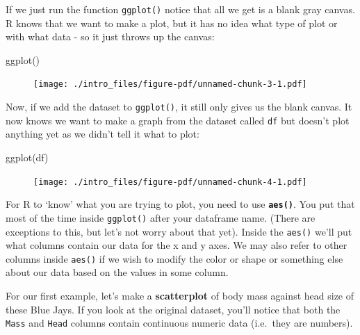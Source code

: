 \documentclass[
  letterpaper,
  DIV=11,
  numbers=noendperiod]{scrreprt}
\newenvironment{Shaded}{\begin{snugshade}}{\end{snugshade}}
\newcommand{\FunctionTok}[1]{\textcolor[rgb]{0.28,0.35,0.67}{#1}}
\newcommand{\NormalTok}[1]{\textcolor[rgb]{0.00,0.23,0.31}{#1}}
\begin{document}
If we just run the function \texttt{ggplot()} notice that all we get is
a blank gray canvas. R knows that we want to make a plot, but it has no
idea what type of plot or with what data - so it just throws up the
canvas:

\begin{Shaded}
\begin{Highlighting}[]
\FunctionTok{ggplot}\NormalTok{()  }
\end{Highlighting}
\end{Shaded}

\begin{figure}[H]

{\centering \texttt{[image: ./intro\_files/figure-pdf/unnamed-chunk-3-1.pdf]}

}

\end{figure}

Now, if we add the dataset to \texttt{ggplot()}, it still only gives us
the blank canvas. It now knows we want to make a graph from the dataset
called \texttt{df} but doesn't plot anything yet as we didn't tell it
what to plot:

\begin{Shaded}
\begin{Highlighting}[]
\FunctionTok{ggplot}\NormalTok{(df)   }
\end{Highlighting}
\end{Shaded}

\begin{figure}[H]

{\centering \texttt{[image: ./intro\_files/figure-pdf/unnamed-chunk-4-1.pdf]}

}

\end{figure}

For R to `know' what you are trying to plot, you need to use
\textbf{\texttt{aes()}}. You put that most of the time inside
\texttt{ggplot()} after your dataframe name. (There are exceptions to
this, but let's not worry about that yet). Inside the \texttt{aes()}
we'll put what columns contain our data for the x and y axes. We may
also refer to other columns inside \texttt{aes()} if we wish to modify
the color or shape or something else about our data based on the values
in some column.

For our first example, let's make a \textbf{scatterplot} of body mass
against head size of these Blue Jays. If you look at the original
dataset, you'll notice that both the \texttt{Mass} and \texttt{Head}
columns contain continuous numeric data (i.e.~they are numbers).
\end{document}
